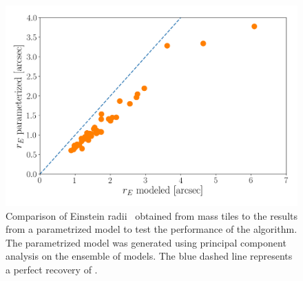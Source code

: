 \begin{figure}
  \includegraphics[width=\linewidth]{img/rE_comp/rE_comp.png}
  \caption{ Comparison of Einstein radii \ER\ obtained from mass tiles
    to the results from a parametrized model to test the performance
    of the algorithm.  The parametrized model was generated using
    principal component analysis on the ensemble of models.  The blue
    dashed line represents a perfect recovery of \ER.  }
  \label{fig:parameter}
\end{figure}



